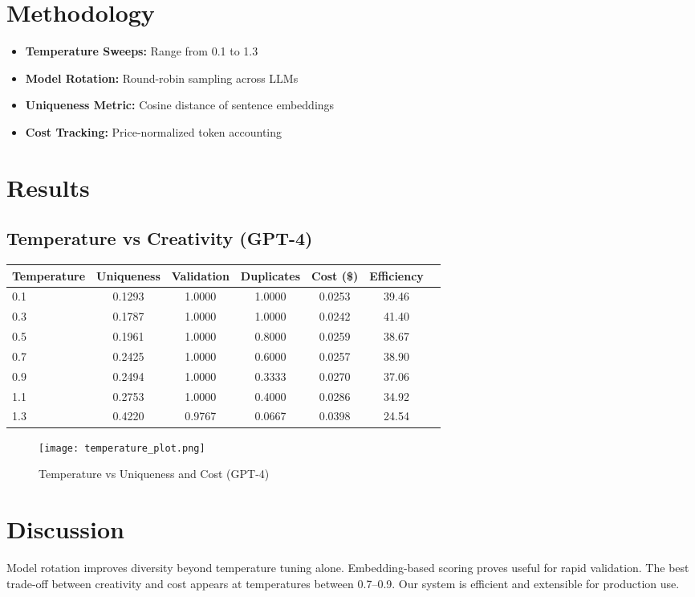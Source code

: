 \documentclass{article}
\begin{document}
\section{Methodology}
\begin{itemize}
  \item \textbf{Temperature Sweeps:} Range from 0.1 to 1.3
  \item \textbf{Model Rotation:} Round-robin sampling across LLMs
  \item \textbf{Uniqueness Metric:} Cosine distance of sentence embeddings
  \item \textbf{Cost Tracking:} Price-normalized token accounting
\end{itemize}

\section{Results}
\subsection*{Temperature vs Creativity (GPT-4)}
\begin{center}
\begin{tabular}{lcccccc}
\toprule
Temperature & Uniqueness & Validation & Duplicates & Cost (\$) & Efficiency \\
\midrule
0.1 & 0.1293 & 1.0000 & 1.0000 & 0.0253 & 39.46 \\
0.3 & 0.1787 & 1.0000 & 1.0000 & 0.0242 & 41.40 \\
0.5 & 0.1961 & 1.0000 & 0.8000 & 0.0259 & 38.67 \\
0.7 & 0.2425 & 1.0000 & 0.6000 & 0.0257 & 38.90 \\
0.9 & 0.2494 & 1.0000 & 0.3333 & 0.0270 & 37.06 \\
1.1 & 0.2753 & 1.0000 & 0.4000 & 0.0286 & 34.92 \\
1.3 & 0.4220 & 0.9767 & 0.0667 & 0.0398 & 24.54 \\
\bottomrule
\end{tabular}
\end{center}

\begin{figure}[h!]
  \centering
  \texttt{[image: temperature\_plot.png]}
  \caption{Temperature vs Uniqueness and Cost (GPT-4)}
  \label{fig:temperature_plot}
\end{figure}

\section{Discussion}
Model rotation improves diversity beyond temperature tuning alone. Embedding-based scoring proves useful for rapid validation. The best trade-off between creativity and cost appears at temperatures between 0.7–0.9. Our system is efficient and extensible for production use.
\end{document}
